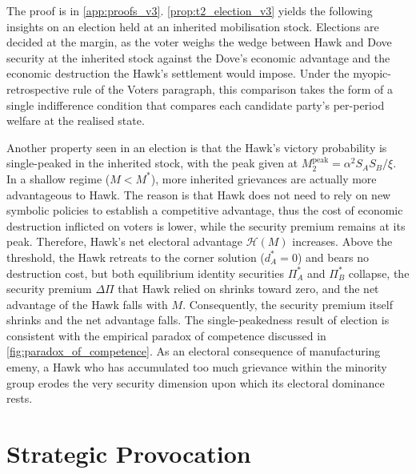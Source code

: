 \documentclass[11pt,twoside]{extarticle}
\begin{document}
The proof is in \autoref{app:proofs_v3}. \autoref{prop:t2_election_v3} yields the following insights on an election held at an inherited mobilisation stock. Elections are decided at the margin, as the voter weighs the wedge between Hawk and Dove security at the inherited stock against the Dove's economic advantage and the economic destruction the Hawk's settlement would impose. Under the myopic-retrospective rule of the Voters paragraph, this comparison takes the form of a single indifference condition that compares each candidate party's per-period welfare at the realised state.  

Another property seen in an election is that the Hawk's victory probability is single-peaked in the inherited stock, with the peak given at $M_2^{\mathrm{peak}}=\alpha^2 S_A S_B/\xi$. 
In a shallow regime ($M < M^*$), more inherited grievances are actually more advantageous to Hawk. The reason is that Hawk does not need to rely on new symbolic policies to establish a competitive advantage, thus the cost of economic destruction inflicted on voters is lower, while the security premium remains at its peak. Therefore, Hawk's net electoral advantage $\mathcal H(M)$ increases.
Above the threshold, the Hawk retreats to the corner solution ($d_A^*=0$) and bears no destruction cost, but both equilibrium identity securities $\Pi_A^*$ and $\Pi_B^*$ collapse, the security premium $\Delta\Pi$ that Hawk relied on shrinks toward zero, and the net advantage of the Hawk falls with $M$.
Consequently, the security premium itself shrinks and the net advantage falls. 
The single-peakedness result of election is consistent with the empirical paradox of competence discussed in \autoref{fig:paradox_of_competence}. 
As an electoral consequence of manufacturing emeny, a Hawk who has accumulated too much grievance within the minority group erodes the very security dimension upon which its electoral dominance rests. 

\section{Strategic Provocation}\label{sec:block3}

\end{document}
